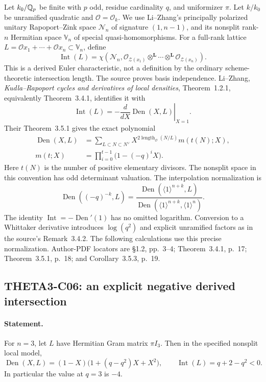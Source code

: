 Let $k_0/\mathbb Q_p$ be finite with $p$ odd, residue cardinality $q$, and
uniformizer $\pi$. Let $k/k_0$ be unramified quadratic and
$\mathcal O=\mathcal O_k$. We use Li--Zhang's principally polarized
unitary Rapoport--Zink space $\mathcal N_n$ of signature $(1,n-1)$,
and its nonsplit rank-$n$ Hermitian space $\mathbb V_n$ of special
quasi-homomorphisms. For a full-rank lattice
$L=\mathcal O x_1+\cdots+\mathcal O x_n\subset\mathbb V_n$, define
\[
 \operatorname{Int}(L)=\chi\left(\mathcal N_n,
  \mathcal O_{\mathcal Z(x_1)}\otimes^{\mathbf L}\cdots
                    \otimes^{\mathbf L}\mathcal O_{\mathcal Z(x_n)}\right).
\]
This is a derived Euler characteristic, not a definition by the
ordinary scheme-theoretic intersection length. The source proves
basis independence. Li--Zhang, \emph{Kudla--Rapoport cycles and
derivatives of local densities}, Theorem~1.2.1, equivalently
Theorem~3.4.1, identifies it with
\[
 \operatorname{Int}(L)=-\left.\frac{d}{dX}
                           \operatorname{Den}(X,L)\right|_{X=1}.
\]
Their Theorem~3.5.1 gives the exact polynomial
\begin{align*}
 \operatorname{Den}(X,L)
 &=\sum_{L\subset N\subset N^\vee}
      X^{2\operatorname{length}_{\mathcal O}(N/L)}m(t(N);X),\\
 m(t;X)&=\prod_{i=0}^{t-1}\bigl(1-(-q)^iX\bigr).
\end{align*}
Here $t(N)$ is the number of positive elementary divisors. The
nonsplit space in this convention has odd determinant valuation.
The interpolation normalization is
\[
 \operatorname{Den}((-q)^{-k},L)
 =\frac{\operatorname{Den}(\langle1\rangle^{n+k},L)}
        {\operatorname{Den}(\langle1\rangle^{n+k},\langle1\rangle^n)}.
\]
The identity $\operatorname{Int}=-\operatorname{Den}'(1)$ has no
omitted logarithm. Conversion to a Whittaker derivative introduces
$\log(q^2)$ and explicit unramified factors as in the source's
Remark~3.4.2. The following calculations use this precise
normalization. Author-PDF locators are \S1.2, pp.~3--4;
Theorem~3.4.1, p.~17; Theorem~3.5.1, p.~18; and
Corollary~3.5.3, p.~19.

\subsection{THETA3-C06: an explicit negative derived intersection}\label{C06}

\paragraph{Statement.}
For $n=3$, let $L$ have Hermitian Gram matrix $\pi I_3$.
Then in the specified nonsplit local model,
\[
 \operatorname{Den}(X,L)=(1-X)\bigl(1+(q-q^2)X+X^2\bigr),
 \qquad \operatorname{Int}(L)=q+2-q^2<0.
\]
In particular the value at $q=3$ is $-4$.

